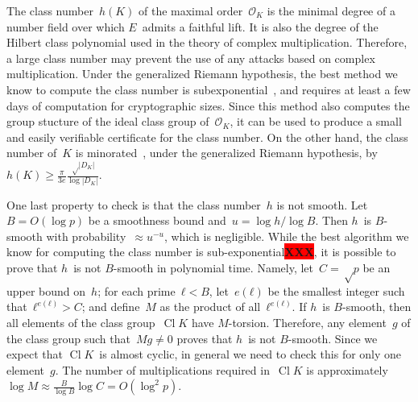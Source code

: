 \documentclass{article}
\let\ro\mathcal
\def\abs#1{\left|#1\right|}
\def\pa#1{\left(#1\right)}
\DeclareMathOperator\Cl{Cl}
\def\XXX{{\colorbox{red}{{\color{white}\bfseries XXX}}}}
\begin{document}
The class number~$h(K)$ of the maximal order~$\ro O_K$
is the minimal degree of a number field
over which $E$~admits a faithful lift.
It is also the degree of the Hilbert class polynomial
used in the theory of complex multiplication.
Therefore, a large class number may prevent the use
of any attacks based on complex multiplication.
Under the generalized Riemann hypothesis,
the best method we know to compute the class number
is subexponential~\cite{chile2009biasse},
and requires at least a few days of computation for cryptographic sizes.
Since this method also computes the group stucture
of the ideal class group of~$\ro O_K$,
it can be used to produce a small and easily verifiable certificate
for the class number.
On the other hand,
the class number of~$K$ is minorated~\cite{cras1990louboutin},
under the generalized Riemann hypothesis,
by~$h(K) ≥ \frac{π}{3e} \frac{√{\abs{D_K}}}{\log \abs{D_K}}$.

\medbreak

One last property to check is that the class number~$h$ is not smooth.
Let~$B = O(\log p)$ be a smoothness bound and~$u = \log h / \log B$.
Then $h$~is $B$-smooth with probability~$≈ u^{-u}$,
which is negligible.
While the best algorithm we know for computing the class number
is sub-exponential\XXX,
it is possible to prove that $h$~is not $B$-smooth in polynomial time.
Namely, let~$C = √p$ be an upper bound on~$h$;
for each prime~$ℓ < B$, let~$e(ℓ)$ be the smallest integer
such that~$ℓ^{e(ℓ)} > C$;
and define~$M$ as the product of all~$ℓ^{e(ℓ)}$.
If $h$~is $B$-smooth, then all elements of the class group~$\Cl K$
have $M$-torsion.
Therefore, any element~$g$ of the class group such that~$M g ≠ 0$
proves that $h$~is not $B$-smooth.
Since we expect that $\Cl K$~is almost cyclic,
in general we need to check this for only one element~$g$.
The number of multiplications required in~$\Cl K$
is approximately~$\log M ≈ \frac{B}{\log B} \log C = O(\log^2 p)$.
\end{document}
